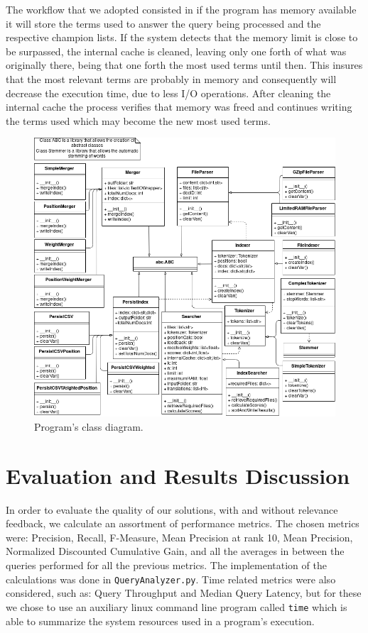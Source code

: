 \documentclass[12pt]{article}
\begin{document}
The workflow that we adopted consisted in if the program has memory available it will store the terms used to answer the query being processed and the respective champion lists. If the system detects that the memory limit is close to be surpassed, the internal cache is cleaned, leaving only one forth of what was originally there, being that one forth the most used terms until then. This insures that the most relevant terms are probably in memory and consequently will decrease the execution time, due to less I/O operations.  After cleaning the internal cache the process verifies that memory was freed and continues writing the terms used which may become the new most used terms.

\begin{figure}[h!]
\includegraphics[width=\linewidth]{ClassDiagram_assign3.png}
\caption{Program's class diagram.}
\label{fig:classdiagram}
\end{figure}

\newpage
\section{Evaluation and Results Discussion}

In order to evaluate the quality of our solutions, with and without relevance 
feedback, we calculate an assortment of performance metrics.
The chosen metrics were: Precision, Recall, F-Measure, Mean Precision at rank 10, 
Mean Precision, Normalized Discounted Cumulative Gain, and all the averages in 
between the queries performed for all the previous metrics.
The implementation of the calculations was done in \texttt{QueryAnalyzer.py}.
Time related metrics were also considered, such as: Query Throughput and Median 
Query Latency, but for these we chose to use an auxiliary linux command line 
program called \texttt{time} which is able to summarize the system resources 
used in a program's execution.
\end{document}
